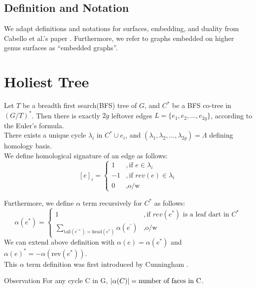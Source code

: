 \documentclass{article}
\begin{document}
\subsection{Definition and Notation}
We adapt definitions and notations for surfaces, embedding, and duality from Cabello et al.'s paper \cite{cabello2013multiple}. Furthermore, we refer to graphs embedded on higher genus surfaces as ``embedded graphs''.

\section{Holiest Tree}
Let $T$ be a breadth first search(BFS) tree of $G$, and $C^{*}$ be a BFS 
co-tree in $(G/T)^*$. Then there is exactly $2g$ leftover edges 
$L = \{e_1, e_2, \ldots, e_{2g}\}$, according to the Euler's formula. \\

There exists a unique cycle $\lambda_i$ in $C^{*} \cup {e_i}$, and $(\lambda_1, 
\lambda_2, \ldots, \lambda_{2g}) = \Lambda$ defining homology basis. \\
We define homological signature of an edge as follows:
\[ [e]_{i} = \begin{cases} 1 & ,\mbox{if } e \in \lambda_i \\
                          -1 & ,\mbox{if } rev(e) \in \lambda_i \\
                           0 & ,\mbox{o/w} \end{cases}\]

Furthermore, we define $\alpha$  term recursively for $C^*$ as follows: \\
\[ \alpha(e^*) = 
  \begin{cases} 1 & ,\mbox{if } rev(e^*) \mbox{ is a leaf dart in } C^{*} \\
                           \sum \limits_{ \text{tail}(e^{'*})
                           = \text{head}(e^*) } \alpha(e^{'}) & ,
                           \mbox{o/w} \end{cases}\]
We can extend above definition with $\alpha(e) = \alpha(e^*)$ and 
  $\alpha(e)^* = - \alpha(\text{rev}(e^*))$. \\

This $\alpha$ term definition was first introduced by Cunningham \cite{cunningham1976network}.

\begin{oneshot}{Observation}
For any cycle C in G, $\mathopen| \alpha(C) \mathclose| = \text{number of faces in C}$.
\end{oneshot}
\end{document}
